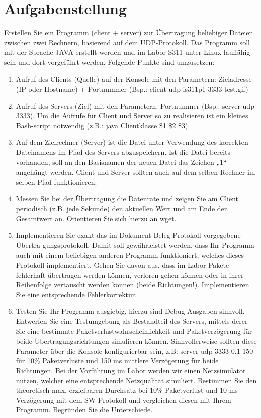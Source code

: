 \documentclass[12pt]{article}
\begin{document}
\section{Aufgabenstellung}

Erstellen Sie ein Programm (client + server) zur Übertragung beliebiger Dateien zwischen zwei Rechnern, basierend auf dem UDP-Protokoll. 
Das Programm soll mit der Sprache JAVA erstellt werden und im Labor S311 unter Linux lauffähig sein und dort vorgeführt werden. 
Folgende Punkte sind umzusetzen:
\begin{enumerate}
    \item Aufruf des Clients (Quelle) auf der Konsole mit den Parametern: Zieladresse (IP oder Hostname) + Portnummer (Bsp.: client-udp is311p1 3333 test.gif)
    
    \item Aufruf des Servers (Ziel) mit den Parametern: Portnummer (Bsp.: server-udp 3333). 
    Um die Aufrufe für Client und Server so zu realisieren ist ein kleines Bash-script notwendig (z.B.: java Clientklasse \$1 \$2 \$3)
    
    \item Auf dem Zielrechner (Server) ist die Datei unter Verwendung des korrekten Dateinamens im Pfad des Servers abzuspeichern. 
    Ist die Datei bereits vorhanden, soll an den Basisnamen der neuen Datei das Zeichen „1“ angehängt werden. 
    Client und Server sollten auch auf dem selben Rechner im selben Pfad funktionieren.

    \item Messen Sie bei der Übertragung die Datenrate und zeigen Sie am Client periodisch (z.B. jede Sekunde) den aktuellen Wert und am Ende den Gesamtwert an. 
    Orientieren Sie sich hierzu an wget.

    \item Implementieren Sie exakt das im Dokument Beleg-Protokoll vorgegebene Übertra-gungsprotokoll. 
    Damit soll gewährleistet werden, dass Ihr Programm auch mit einem beliebigen anderen Programm funktioniert, welches dieses Protokoll implementiert.
    Gehen Sie davon aus, dass im Labor Pakete fehlerhaft übertragen werden können, verloren gehen können oder in ihrer Reihenfolge vertauscht werden können (beide Richtungen!). Implementieren Sie eine entsprechende Fehlerkorrektur.

    \item Testen Sie Ihr Programm ausgiebig, hierzu sind Debug-Ausgaben sinnvoll. Entwerfen Sie eine Testumgebung als Bestandteil des Servers, mittels derer Sie eine bestimmte Paketverlustwahrscheinlichkeit und Paketverzögerung für beide Übertragungsrichtungen simulieren können. Sinnvollerweise sollten diese Parameter über die Konsole konfigurierbar sein, z.B: server-udp 3333 0.1 150 für 10\% Paketverluste und 150 ms mittlere Verzögerung für beide Richtungen. Bei der Vorführung im Labor werden wir einen Netzsimulator nutzen, welcher eine entsprechende Netzqualität simuliert.
    Bestimmen Sie den theoretisch max. erzielbaren Durchsatz bei 10\% Paketverlust und 10 ms Verzögerung mit dem SW-Protokoll und vergleichen diesen mit Ihrem Programm. Begründen Sie die Unterschiede.


\end{enumerate}
\end{document}
